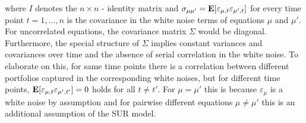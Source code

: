 \documentclass[a4paper, 11pt]{scrreprt}
\newcommand{\ew}{\mbox{\textbf{E}}}
\begin{document}
where $I$ denotes the $n \times n$ - identity matrix and $\sigma_{\mu \mu'} = \ew[\varepsilon_{\mu,t} \varepsilon_{\mu',t}]$ for every time point $t=1,\ldots,n$ is the covariance in the white noise terms of equations $\mu$ and $\mu'$. For uncorrelated equations, the covariance matrix $\Sigma$ would be diagonal.
Furthermore, the special structure of $\Sigma$ implies constant variances and covariances over time and the absence of serial correlation in the white noise. To elaborate on this, for same time points there is a correlation between different portfolios captured in the corresponding white noises, but for different time points, 
$\ew[\varepsilon_{\mu,t} \varepsilon_{\mu',t'}] =0$ holds for all $t\neq t'$. For $\mu = \mu'$ this is because $\varepsilon_{\mu}$ is a white noise by assumption and for pairwise different equations $\mu \neq \mu'$ this is an additional assumption of the SUR model.
\end{document}
